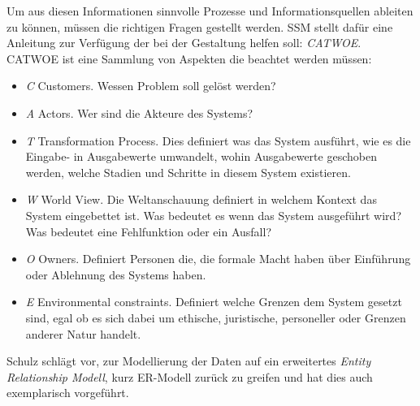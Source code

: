 Um aus diesen Informationen sinnvolle Prozesse und Informationsquellen ableiten zu können, müssen die richtigen Fragen gestellt werden. SSM stellt dafür eine Anleitung zur Verfügung der bei der Gestaltung helfen soll: \textit{CATWOE}. CATWOE ist eine Sammlung von Aspekten die beachtet werden müssen:
\begin{itemize}
	\item \textit{C} Customers. Wessen Problem soll gelöst werden?
	\item \textit{A} Actors. Wer sind die Akteure des Systems?
	\item \textit{T} Transformation Process. Dies definiert was das System ausführt, wie es die Eingabe- in Ausgabewerte umwandelt, wohin Ausgabewerte geschoben werden, welche Stadien und Schritte in diesem System existieren.
	\item \textit{W} World View. Die Weltanschauung definiert in welchem Kontext das System eingebettet ist. Was bedeutet es wenn das System ausgeführt wird? Was bedeutet eine Fehlfunktion oder ein Ausfall?
	\item \textit{O} Owners. Definiert Personen die, die formale Macht haben über Einführung oder Ablehnung des Systems haben.
	\item \textit{E} Environmental constraints. Definiert welche Grenzen dem System gesetzt sind, egal ob es sich dabei um ethische, juristische, personeller oder Grenzen anderer Natur handelt.
\end{itemize}

Schulz schlägt vor, zur Modellierung der Daten auf ein erweitertes \textit{Entity Relationship Modell}, kurz ER-Modell zurück zu greifen und hat dies auch exemplarisch vorgeführt. 


